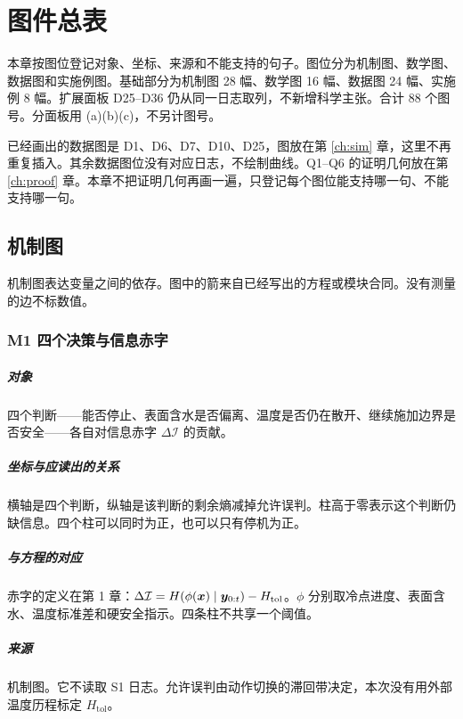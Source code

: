 \chapter{图件总表}
\label{ch:figures}

本章按图位登记对象、坐标、来源和不能支持的句子。图位分为机制图、数学图、数据图和实施例图。基础部分为机制图 28 幅、数学图 16 幅、数据图 24 幅、实施例 8 幅。扩展面板 D25--D36 仍从同一日志取列，不新增科学主张。合计 88 个图号。分面板用 (a)(b)(c)，不另计图号。

已经画出的数据图是 D1、D6、D7、D10、D25，图放在第 \ref{ch:sim} 章，这里不再重复插入。其余数据图位没有对应日志，不绘制曲线。Q1--Q6 的证明几何放在第 \ref{ch:proof} 章。本章不把证明几何再画一遍，只登记每个图位能支持哪一句、不能支持哪一句。
\section{机制图}

机制图表达变量之间的依存。图中的箭来自已经写出的方程或模块合同。没有测量的边不标数值。

\subsection{M1 四个决策与信息赤字}
\paragraph{对象}
四个判断——能否停止、表面含水是否偏离、温度是否仍在散开、继续施加边界是否安全——各自对信息赤字 $\Delta\mathcal{I}$ 的贡献。

\paragraph{坐标与应读出的关系}
横轴是四个判断，纵轴是该判断的剩余熵减掉允许误判。柱高于零表示这个判断仍缺信息。四个柱可以同时为正，也可以只有停机为正。

\paragraph{与方程的对应}
赤字的定义在第 1 章：$\Delta\mathcal{I}=H(\phi(\bm{x})\mid\bm{y}_{0:t})-H_{\mathrm{tol}}$。$\phi$ 分别取冷点进度、表面含水、温度标准差和硬安全指示。四条柱不共享一个阈值。

\paragraph{来源}
机制图。它不读取 S1 日志。允许误判由动作切换的滞回带决定，本次没有用外部温度历程标定 $H_{\mathrm{tol}}$。

